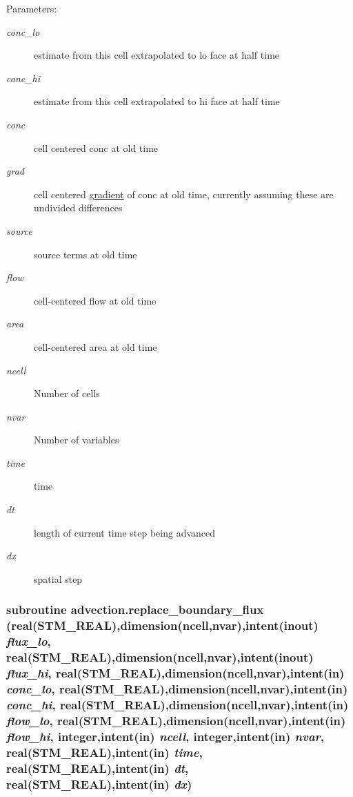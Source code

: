 \begin{Desc}
\item[Parameters:]
\begin{description}
\item[{\em conc\_\-lo}]estimate from this cell extrapolated to lo face at half time\item[{\em conc\_\-hi}]estimate from this cell extrapolated to hi face at half time\item[{\em conc}]cell centered conc at old time\item[{\em grad}]cell centered \hyperlink{a00033}{gradient} of conc at old time, currently assuming these are undivided differences\item[{\em source}]source terms at old time\item[{\em flow}]cell-centered flow at old time\item[{\em area}]cell-centered area at old time\item[{\em ncell}]Number of cells\item[{\em nvar}]Number of variables\item[{\em time}]time\item[{\em dt}]length of current time step being advanced\item[{\em dx}]spatial step \end{description}
\end{Desc}
\hypertarget{a00026_ce0b27ec0ac171c15a919d07fb3b32c3}{
\subsubsection[{replace\_\-boundary\_\-flux}]{\setlength{\rightskip}{0pt plus 5cm}subroutine advection.replace\_\-boundary\_\-flux (real(STM\_\-REAL),dimension(ncell,nvar),intent(inout) {\em flux\_\-lo}, \/  real(STM\_\-REAL),dimension(ncell,nvar),intent(inout) {\em flux\_\-hi}, \/  real(STM\_\-REAL),dimension(ncell,nvar),intent(in) {\em conc\_\-lo}, \/  real(STM\_\-REAL),dimension(ncell,nvar),intent(in) {\em conc\_\-hi}, \/  real(STM\_\-REAL),dimension(ncell,nvar),intent(in) {\em flow\_\-lo}, \/  real(STM\_\-REAL),dimension(ncell,nvar),intent(in) {\em flow\_\-hi}, \/  integer,intent(in) {\em ncell}, \/  integer,intent(in) {\em nvar}, \/  real(STM\_\-REAL),intent(in) {\em time}, \/  real(STM\_\-REAL),intent(in) {\em dt}, \/  real(STM\_\-REAL),intent(in) {\em dx})}}
\label{a00026_ce0b27ec0ac171c15a919d07fb3b32c3}


